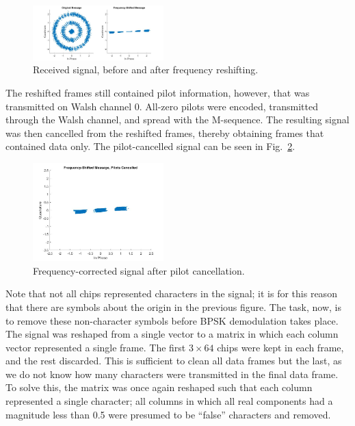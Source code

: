 \documentclass[journal]{IEEEtran}
\begin{document}
\begin{figure}[!htbp]
    \centering
    \includegraphics[width = 0.45\textwidth]{freq_shift.jpg}
    \caption{Received signal, before and after frequency reshifting.}
    \label{fig:freqshift}
\end{figure}

The reshifted frames still contained pilot information, however, that was transmitted on Walsh channel 0. All-zero pilots were encoded, transmitted through the Walsh channel, and spread with the M-sequence. The resulting signal was then cancelled from the reshifted frames, thereby obtaining frames that contained data only. The pilot-cancelled signal can be seen in Fig.~\ref{fig:nopilots}.

\begin{figure}[!htbp]
    \centering
    \includegraphics[width = 0.45\textwidth]{nopilots.jpg}
    \caption{Frequency-corrected signal after pilot cancellation.}
    \label{fig:nopilots}
\end{figure}

Note that not all chips represented characters in the signal; it is for this reason that there are symbols about the origin in the previous figure. The task, now, is to remove these non-character symbols before BPSK demodulation takes place. The signal was reshaped from a single vector to a matrix in which each column vector represented a single frame. The first $3\times64$ chips were kept in each frame, and the rest discarded. This is sufficient to clean all data frames but the last, as we do not know how many characters were transmitted in the final data frame. To solve this, the matrix was once again reshaped such that each column represented a single character; all columns in which all real components had a magnitude less than 0.5 were presumed to be ``false'' characters and removed.
\end{document}
